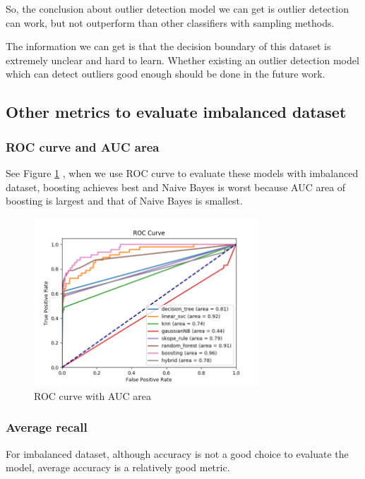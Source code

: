 So, the conclusion about outlier detection model we can get is outlier detection can work, but not outperform than other classifiers with sampling methods.

The information we can get is that the decision boundary of this dataset is extremely unclear and hard to learn. Whether existing an outlier detection model which can detect outliers good enough should be done in the future work.

\subsection{Other metrics to evaluate imbalanced dataset}
\subsubsection{ROC curve and AUC area}

See Figure \ref{fig: roc_curve_sum} , when we use ROC curve to evaluate these models with imbalanced dataset, boosting achieves best and Naive Bayes is worst because AUC area of boosting is largest and that of Naive Bayes is smallest.

\begin{figure}
  \includegraphics[width=0.75\textwidth]
  {roc_curve_sum.png}
\caption{ROC curve with AUC area}
\label{fig: roc_curve_sum}       %
\end{figure}

\subsubsection{Average recall}

For imbalanced dataset, although accuracy is not a good choice to evaluate the model, average accuracy is a relatively good metric.

